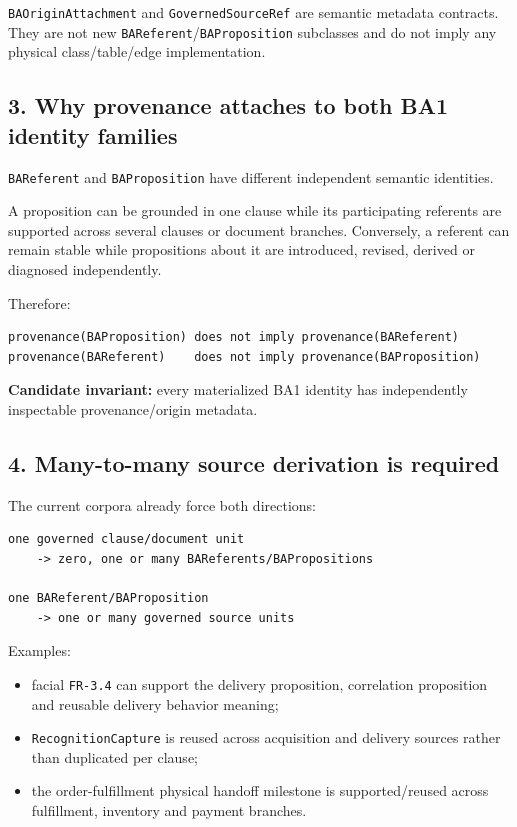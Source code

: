 \documentclass[11pt,a4paper]{article}
\providecommand{\tightlist}{\setlength{\itemsep}{0pt}\setlength{\parskip}{0pt}}
\begin{document}
\texttt{BAOriginAttachment} and \texttt{GovernedSourceRef} are semantic metadata contracts. They are not new \texttt{BAReferent}/\texttt{BAProposition} subclasses and do not imply any physical class/table/edge implementation.

\subsection{3. Why provenance attaches to both BA1 identity families}\label{3-why-provenance-attaches-to-both-ba1-identity-families}

\texttt{BAReferent} and \texttt{BAProposition} have different independent semantic identities.

A proposition can be grounded in one clause while its participating referents are supported across several clauses or document branches. Conversely, a referent can remain stable while propositions about it are introduced, revised, derived or diagnosed independently.

Therefore:

\begin{verbatim}
provenance(BAProposition) does not imply provenance(BAReferent)
provenance(BAReferent)    does not imply provenance(BAProposition)
\end{verbatim}

\textbf{Candidate invariant:} every materialized BA1 identity has independently inspectable provenance/origin metadata.

\subsection{4. Many-to-many source derivation is required}\label{4-many-to-many-source-derivation-is-required}

The current corpora already force both directions:

\begin{verbatim}
one governed clause/document unit
    -> zero, one or many BAReferents/BAPropositions

one BAReferent/BAProposition
    -> one or many governed source units
\end{verbatim}

Examples:

\begin{itemize}
\tightlist
\item
  facial \texttt{FR-3.4} can support the delivery proposition, correlation proposition and reusable delivery behavior meaning;
\item
  \texttt{RecognitionCapture} is reused across acquisition and delivery sources rather than duplicated per clause;
\item
  the order-fulfillment physical handoff milestone is supported/reused across fulfillment, inventory and payment branches.
\end{itemize}
\end{document}
